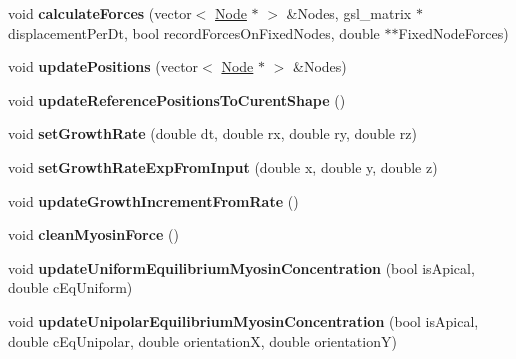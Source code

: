 \begin{DoxyCompactItemize}
\item 
\hypertarget{classShapeBase_a5a30dc6b5a4ea35986b5f1f7d9b390a8}{}void {\bfseries calculate\+Forces} (vector$<$ \hyperlink{classNode}{Node} $\ast$ $>$ \&Nodes, gsl\+\_\+matrix $\ast$displacement\+Per\+Dt, bool record\+Forces\+On\+Fixed\+Nodes, double $\ast$$\ast$Fixed\+Node\+Forces)\label{classShapeBase_a5a30dc6b5a4ea35986b5f1f7d9b390a8}

\item 
\hypertarget{classShapeBase_a990c3d93836d53687b8af49a489dbde4}{}void {\bfseries update\+Positions} (vector$<$ \hyperlink{classNode}{Node} $\ast$ $>$ \&Nodes)\label{classShapeBase_a990c3d93836d53687b8af49a489dbde4}

\item 
\hypertarget{classShapeBase_a67c28a77c275496eaecc88005e097819}{}void {\bfseries update\+Reference\+Positions\+To\+Curent\+Shape} ()\label{classShapeBase_a67c28a77c275496eaecc88005e097819}

\item 
\hypertarget{classShapeBase_ac06c53088788e3c1461233623f506dbb}{}void {\bfseries set\+Growth\+Rate} (double dt, double rx, double ry, double rz)\label{classShapeBase_ac06c53088788e3c1461233623f506dbb}

\item 
\hypertarget{classShapeBase_ad463361e0b893ceee62a5c65c4c0e0f6}{}void {\bfseries set\+Growth\+Rate\+Exp\+From\+Input} (double x, double y, double z)\label{classShapeBase_ad463361e0b893ceee62a5c65c4c0e0f6}

\item 
\hypertarget{classShapeBase_ad7d7957431a1ae402347efb03ad94d0e}{}void {\bfseries update\+Growth\+Increment\+From\+Rate} ()\label{classShapeBase_ad7d7957431a1ae402347efb03ad94d0e}

\item 
\hypertarget{classShapeBase_aaf8312bb00ea6178abd9ebb1e8f40099}{}void {\bfseries clean\+Myosin\+Force} ()\label{classShapeBase_aaf8312bb00ea6178abd9ebb1e8f40099}

\item 
\hypertarget{classShapeBase_a47ac1da121eea90c265647b6f2115bfe}{}void {\bfseries update\+Uniform\+Equilibrium\+Myosin\+Concentration} (bool is\+Apical, double c\+Eq\+Uniform)\label{classShapeBase_a47ac1da121eea90c265647b6f2115bfe}

\item 
\hypertarget{classShapeBase_a6e4cc22d01118cf2dcb77276b56edf9d}{}void {\bfseries update\+Unipolar\+Equilibrium\+Myosin\+Concentration} (bool is\+Apical, double c\+Eq\+Unipolar, double orientation\+X, double orientation\+Y)\label{classShapeBase_a6e4cc22d01118cf2dcb77276b56edf9d}


\end{DoxyCompactItemize}
